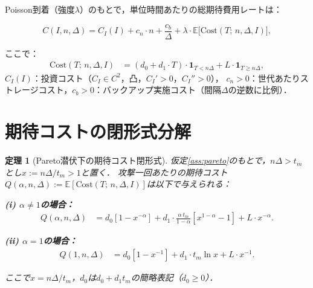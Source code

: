 \documentclass[12pt,a4paper]{article}
\theoremstyle{plain}
\newtheorem{theorem}{定理}[section]
\theoremstyle{definition}
\theoremstyle{remark}
\newcommand{\E}{\mathbb{E}}
\begin{document}
Poisson到着（強度$\lambda$）のもとで，単位時間あたりの総期待費用レートは：

\begin{equation}\label{eq:cost_rate}
  C(I,n,\Delta) = C_I(I) + c_n\cdot n + \frac{c_b}{\Delta}
  + \lambda\cdot\E\bigl[\mathrm{Cost}(T;\,n,\Delta,I)\bigr],
\end{equation}

ここで：
\begin{align}
  \mathrm{Cost}(T;\,n,\Delta,I)
  &= (d_0+d_1\cdot T)\cdot\mathbf{1}_{T<n\Delta}
    + L\cdot\mathbf{1}_{T\ge n\Delta}, \label{eq:cost_per_attack}
\end{align}
$C_I(I)$：投資コスト（$C_I\in C^2$，凸，$C_I'>0$，$C_I''>0$），
$c_n>0$：世代あたりストレージコスト，$c_b>0$：バックアップ実施コスト（間隔$\Delta$の逆数に比例）．

\section{期待コストの閉形式分解}
\label{sec:decomp}

\begin{theorem}[Pareto潜伏下の期待コスト閉形式]\label{thm:decomp}
仮定\ref{ass:pareto}のもとで，$n\Delta>t_m$とし$x:=n\Delta/t_m>1$と置く．
攻撃一回あたりの期待コスト$Q(\alpha,n,\Delta):=\E[\mathrm{Cost}(T;\,n,\Delta,I)]$は以下で与えられる：

\noindent\textbf{(i) $\alpha\ne1$の場合：}
\begin{align}
  Q(\alpha,n,\Delta)
  &= d_0\left[1-x^{-\alpha}\right]
  + d_1\cdot\frac{\alpha\,t_m}{1-\alpha}\left[x^{1-\alpha}-1\right]
  + L\cdot x^{-\alpha}. \label{eq:Q_general}
\end{align}

\noindent\textbf{(ii) $\alpha=1$の場合：}
\begin{align}
  Q(1,n,\Delta)
  &= d_0\left[1-x^{-1}\right]
  + d_1\cdot t_m\ln x
  + L\cdot x^{-1}. \label{eq:Q_alpha1}
\end{align}

\noindent ここで$x=n\Delta/t_m$，$d_0$は$d_0+d_1 t_m$の簡略表記（$d_0\ge0$）．
\end{theorem}
\end{document}

